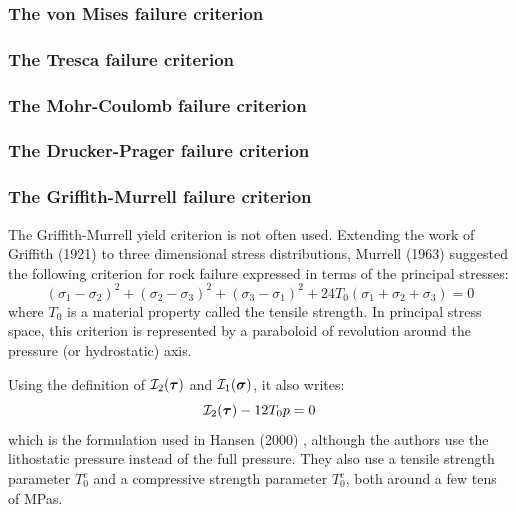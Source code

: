 \subsubsection{The von Mises failure criterion}\label{sec:vMcriterion}


\subsubsection{The Tresca failure criterion}


\subsubsection{The Mohr-Coulomb failure criterion}


\subsubsection{The Drucker-Prager failure criterion}


\subsubsection{The Griffith-Murrell failure criterion}

The Griffith-Murrell yield criterion \cite{brau94,brbe95,babr97} is not often used. 
Extending the work of Griffith (1921) to three dimensional stress distributions, 
Murrell (1963) suggested the following criterion for rock failure expressed 
in terms of the principal stresses:
\[
(\sigma_1-\sigma_2)^2 + (\sigma_2-\sigma_3)^2 + (\sigma_3-\sigma_1)^2
+
24T_0 (\sigma_1+\sigma_2+\sigma_3)=0
\]
where $T_0$ is a material property called the tensile strength. In principal stress space, 
this criterion is represented by a paraboloid of revolution around the pressure (or hydrostatic) axis.

Using the definition of ${\cal I}_2({\bm \tau})$ and ${\cal I}_1({\bm \sigma})$, it also writes:
\[
{\cal I}_2({\bm \tau}) - 12 T_0 p =0
\]
which is the formulation used in Hansen \etal (2000) \cite{hanl00}, although the authors
use the lithostatic pressure instead of the full pressure. They also use a tensile 
strength parameter $T_0^e$ and a compressive strength parameter $T_0^c$, both around a few tens 
of MPas.

